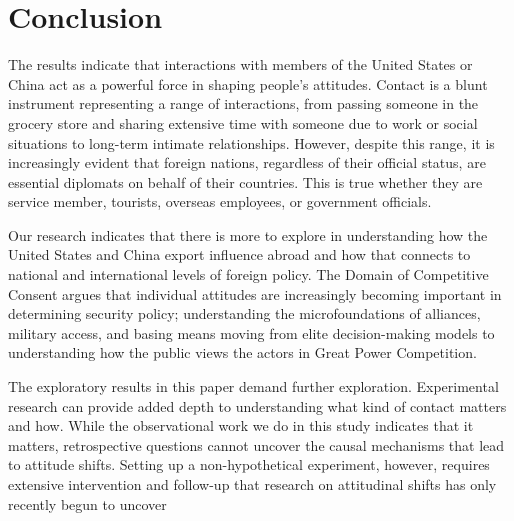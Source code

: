 \section*{Conclusion}

The results indicate that interactions with members of the United States or China act as a powerful force in shaping people's attitudes. Contact is a blunt instrument representing a range of interactions, from passing someone in the grocery store and sharing extensive time with someone due to work or social situations to long-term intimate relationships. However, despite this range, it is increasingly evident that foreign nations, regardless of their official status, are essential diplomats on behalf of their countries. This is true whether they are service member, tourists, overseas employees, or government officials. 

Our research indicates that there is more to explore in understanding how the United States and China export influence abroad and how that connects to national and international levels of foreign policy. The Domain of Competitive Consent argues that individual attitudes are increasingly becoming important in determining security policy; understanding the microfoundations of alliances, military access, and basing means moving from elite decision-making models to understanding how the public views the actors in Great Power Competition.

The exploratory results in this paper demand further exploration. Experimental research can provide added depth to understanding what kind of contact matters and how. While the observational work we do in this study indicates that it matters, retrospective questions cannot uncover the causal mechanisms that lead to attitude shifts. Setting up a non-hypothetical experiment, however, requires extensive intervention and follow-up that research on attitudinal shifts has only recently begun to uncover \cite{broockman2016,kalla2020}

